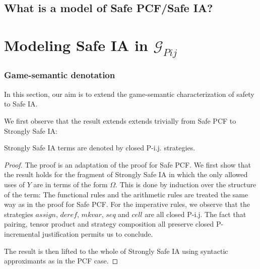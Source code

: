 \subsection{What is a model of Safe PCF/Safe IA?}




\section{\texorpdfstring{Modeling Safe IA in $\mathcal{G}_{Pij}$}
{Categorical model of safe IA}}


\subsubsection{Game-semantic denotation}

In this section, our aim is to extend the game-semantic characterization of safety to Safe IA.

We first observe that the result extends extends trivially from Safe PCF to Strongly Safe IA:
\begin{proposition}
  Strongly Safe IA terms are denoted by closed P-i.j. strategies.
\end{proposition}
\begin{proof}
The proof is an adaptation of the proof for Safe PCF. We first show that the result holds for the
fragment of Strongly Safe IA in which the only allowed uses of $Y$ are in terms of the form $\Omega$.
This is done by induction over the structure of the term:
The functional rules and the arithmetic rules are treated
the same way as in the proof for Safe PCF. For the imperative rules, we
observe that the strategies $assign$, $deref$, $mkvar$, $seq$ and
$cell$ are all closed P-i.j. The fact that pairing, tensor product
and strategy composition all preserve closed P-incremental
justification permits us to conclude.

The result is then lifted to the whole of Strongly Safe IA using syntactic approximants as in the PCF case.
\end{proof}

